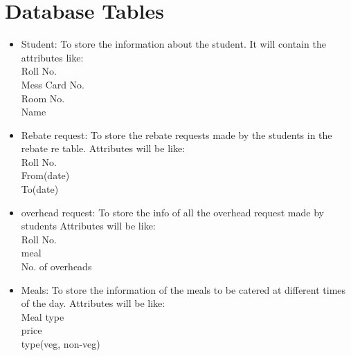 \newpage
\section{Database Tables}
\begin{itemize}
    \item Student: To store the information about the student. It  will contain the attributes like: \\
    Roll No.\\
    Mess Card No.\\
    Room No.\\
    Name\\
    \item Rebate request: To store the rebate requests made by the students in the rebate re table. Attributes will be like:\\Roll No.\\From(date)\\To(date)\\
    
    \item overhead request: To store the info of all the overhead request made by students Attributes will be like:\\Roll No.\\meal\\No. of overheads\\
    
    \item Meals: To store the information of the meals to be catered at different times of the day. Attributes will be like:\\Meal type\\ price \\type(veg, non-veg)\\
    
    
    
\end{itemize}

\newpage

